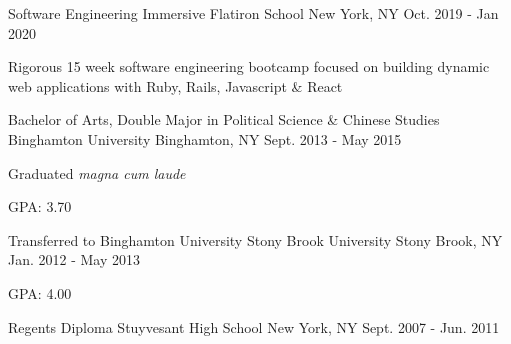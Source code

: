 \vspace{-2.0mm}

\begin{cventries}

  \cventry
    {Software Engineering Immersive} %
    {Flatiron School} %
    {New York, NY} %
    {Oct. 2019 - Jan 2020} %
    {
      \begin{cvitems} %
        \item {Rigorous 15 week software engineering bootcamp focused on building dynamic web applications with Ruby, Rails, Javascript \& React}
      \end{cvitems}
  }


  \cventry
    {Bachelor of Arts, Double Major in Political Science \& Chinese Studies} %
    {Binghamton University} %
    {Binghamton, NY} %
    {Sept. 2013 - May 2015} %
    {
      \begin{cvitems} %
        \item Graduated \textit{magna cum laude}
        \item {GPA: 3.70}
      \end{cvitems}
    }

  \cventry
    {Transferred to Binghamton University} %
    {Stony Brook University} %
    {Stony Brook, NY} %
    {Jan. 2012 - May 2013} %
    {
      \begin{cvitems} %
        \item {GPA: 4.00}
      \end{cvitems}
    }

  \cventry
    {Regents Diploma} %
    {Stuyvesant High School} %
    {New York, NY} %
    {Sept. 2007 - Jun. 2011} %
    {
    }
    \vspace{-\baselineskip}



\end{cventries}
